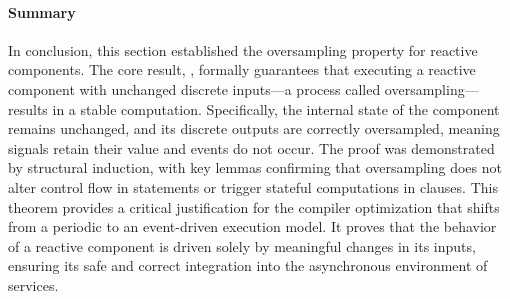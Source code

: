 \paragraph{Summary}
In conclusion, this section established the oversampling property for reactive \GRSync components.
%
The core result, , formally guarantees that
executing a reactive component with unchanged discrete inputs---a process called oversampling---%
results in a stable computation.
%
Specifically, the internal state of the component remains unchanged, and its discrete outputs are
correctly oversampled, meaning signals retain their value and events do not occur.
%
The proof was demonstrated by structural induction, with key lemmas confirming that oversampling
does not alter control flow in  statements or trigger stateful computations in
 clauses.
%
This theorem provides a critical justification for the compiler optimization that shifts from a
periodic to an event-driven execution model. It proves that the behavior of a reactive component is
driven solely by meaningful changes in its inputs, ensuring its safe and correct integration into
the asynchronous environment of \GRFRP services.
